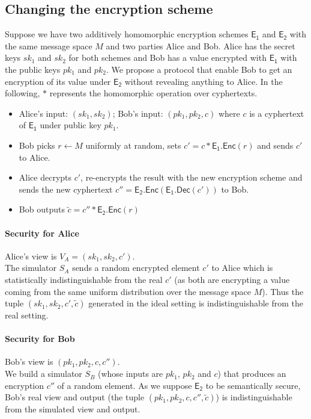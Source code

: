 \documentclass[11pt]{article}
\begin{document}
\subsection{Changing the encryption scheme} %
\label{sub:changing_encryption_scheme}
	Suppose we have two additively homomorphic encryption schemes $\mathsf{E_1}$ and $\mathsf{E_2}$ with the same message space $M$ and two parties Alice and Bob. Alice has the secret keys $sk_1$ and $sk_2$ for both schemes and Bob has a value encrypted with $\mathsf{E_1}$ with the public keys $pk_1$ and $pk_2$. We propose a protocol that enable Bob to get an encryption of its value under $\mathsf{E_2}$ without revealing anything to Alice. In the following, $*$ represents the homomorphic operation over cyphertexts. 
	
	\begin{itemize}
		\item Alice's input: $(sk_1,sk_2)$; Bob's input: $(pk_1,pk_2,c)$ where $c$ is a cyphertext of $\mathsf{E_1}$ under public key $pk_1$.
		   
		\item Bob picks $r \leftarrow M$ uniformly at random, sets $c' = c * \mathsf{E_1.Enc}(r)$ and sends $c'$ to Alice.
		
		\item Alice decrypts $c'$, re-encrypts the result with the new encryption scheme and sends the new cyphertext $c'' = \mathsf{E_2.Enc}(\mathsf{E_1.Dec}(c'))$ to Bob.
		
		\item Bob outputs $\tilde{c} = c'' * \mathsf{E_2.Enc}(r)$  
		
	\end{itemize}
	      
	\paragraph{Security for Alice} Alice's view is $V_A = (sk_1,sk_2,c')$.\\
	The simulator $S_A$ sends a random encrypted element $c'$ to Alice which is statistically indistinguishable from the real $c'$ (as both are encrypting a value coming from the same uniform distribution over the message space $M$). Thus the tuple $(sk_1,sk_2,c',\tilde{c})$  generated in the ideal setting is indistinguishable from the real setting.

	\paragraph{Security for Bob} Bob's view is $(pk_1,pk_2,c,c'')$.\\   
	We build a simulator $S_B$ (whose inputs are $pk_1$, $pk_2$ and $c$) that produces an encryption $c''$ of a random element. As we suppose $\mathsf{E_2}$ to be semantically secure, Bob's real view and output (the tuple $(pk_1,pk_2,c,c'',\tilde{c})$) is indistinguishable from the simulated view and output.   
\end{document}
